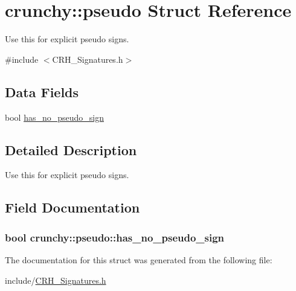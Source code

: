 \hypertarget{structcrunchy_1_1pseudo}{}\section{crunchy\+:\+:pseudo Struct Reference}
\label{structcrunchy_1_1pseudo}


Use this for explicit pseudo signs.  




{\ttfamily \#include $<$C\+R\+H\+\_\+\+Signatures.\+h$>$}

\subsection*{Data Fields}
\begin{DoxyCompactItemize}
\item 
bool \hyperlink{structcrunchy_1_1pseudo_a2ee9a07f78935a9382213249e98b43fb}{has\+\_\+no\+\_\+pseudo\+\_\+sign}
\end{DoxyCompactItemize}


\subsection{Detailed Description}
Use this for explicit pseudo signs. 

\subsection{Field Documentation}
\subsubsection[{has\+\_\+no\+\_\+pseudo\+\_\+sign}]{\setlength{\rightskip}{0pt plus 5cm}bool crunchy\+::pseudo\+::has\+\_\+no\+\_\+pseudo\+\_\+sign}\hypertarget{structcrunchy_1_1pseudo_a2ee9a07f78935a9382213249e98b43fb}{}\label{structcrunchy_1_1pseudo_a2ee9a07f78935a9382213249e98b43fb}


The documentation for this struct was generated from the following file\+:\begin{DoxyCompactItemize}
\item 
include/\hyperlink{_c_r_h___signatures_8h}{C\+R\+H\+\_\+\+Signatures.\+h}\end{DoxyCompactItemize}
